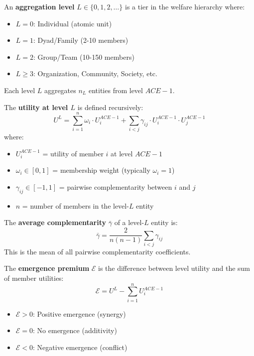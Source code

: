 \begin{definition}
\label{def:level}
An \textbf{aggregation level} $L \in \{0, 1, 2, \ldots\}$ is a tier in the
welfare hierarchy where:
\begin{itemize}[nosep]
\item $L = 0$: Individual (atomic unit)
\item $L = 1$: Dyad/Family (2-10 members)
\item $L = 2$: Group/Team (10-150 members)
\item $L \geq 3$: Organization, Community, Society, etc.
\end{itemize}
Each level $L$ aggregates $n_L$ entities from level $ACE-1$.
\end{definition}

\begin{definition}
\label{def:level-utility}
The \textbf{utility at level $L$} is defined recursively:
\begin{equation}
U^L = \sum_{i=1}^{n} \omega_i \cdot U^{ACE-1}_i + \sum_{i<j} \gamma_{ij} \cdot U^{ACE-1}_i \cdot U^{ACE-1}_j
\label{eq:level-utility}
\end{equation}
where:
\begin{itemize}[nosep]
\item $U^{ACE-1}_i$ = utility of member $i$ at level $ACE-1$
\item $\omega_i \in [0,1]$ = membership weight (typically $\omega_i = 1$)
\item $\gamma_{ij} \in [-1, 1]$ = pairwise complementarity between $i$ and $j$
\item $n$ = number of members in the level-$L$ entity
\end{itemize}
\end{definition}

\begin{definition}
\label{def:avg-gamma}
The \textbf{average complementarity} $\bar{\gamma}$ of a level-$L$ entity is:
\begin{equation}
\bar{\gamma} = \frac{2}{n(n-1)} \sum_{i<j} \gamma_{ij}
\label{eq:avg-gamma}
\end{equation}
This is the mean of all pairwise complementarity coefficients.
\end{definition}

\begin{definition}
\label{def:emergence}
The \textbf{emergence premium} $\mathcal{E}$ is the difference between
level utility and the sum of member utilities:
\begin{equation}
\mathcal{E} = U^L - \sum_{i=1}^{n} U^{ACE-1}_i
\label{eq:emergence-def}
\end{equation}
\begin{itemize}[nosep]
\item $\mathcal{E} > 0$: Positive emergence (synergy)
\item $\mathcal{E} = 0$: No emergence (additivity)
\item $\mathcal{E} < 0$: Negative emergence (conflict)
\end{itemize}
\end{definition}

